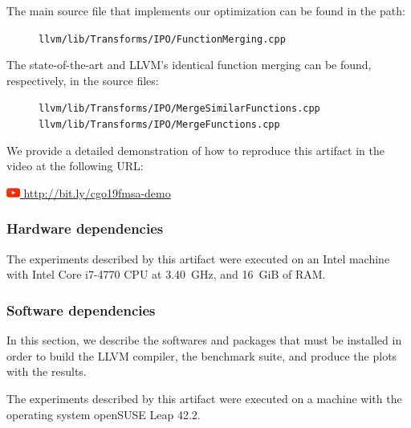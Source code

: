 {\begin{itemize}
\end{itemize}

The main source file that implements our optimization can be found in the path:
\begin{figure}[h]
\texttt{\footnotesize llvm/lib/Transforms/IPO/FunctionMerging.cpp}
\end{figure}

The state-of-the-art and LLVM's identical function merging can be found,
respectively, in the source files:
\begin{figure}[h]
\texttt{\footnotesize llvm/lib/Transforms/IPO/MergeSimilarFunctions.cpp}
\texttt{\footnotesize llvm/lib/Transforms/IPO/MergeFunctions.cpp}
\end{figure}

We provide a detailed demonstration of how to reproduce this artifact in the video at the following URL:

\href{http://bit.ly/cgo19fmsa-video}{\includegraphics[width=1.2em]{figs/artifact/youtube.png} http://bit.ly/cgo19fmsa-demo}


\subsubsection{Hardware dependencies}


The experiments described by this artifact were executed on an Intel machine
with Intel Core i7-4770 CPU at 3.40~GHz, and 16~GiB of RAM.


\subsubsection{Software dependencies}

In this section, we describe the softwares and packages that must be installed 
in order to build the LLVM compiler, the benchmark suite, and produce the plots with the results.

The experiments described by this artifact were executed on a machine
with the operating system openSUSE Leap 42.2.

}
